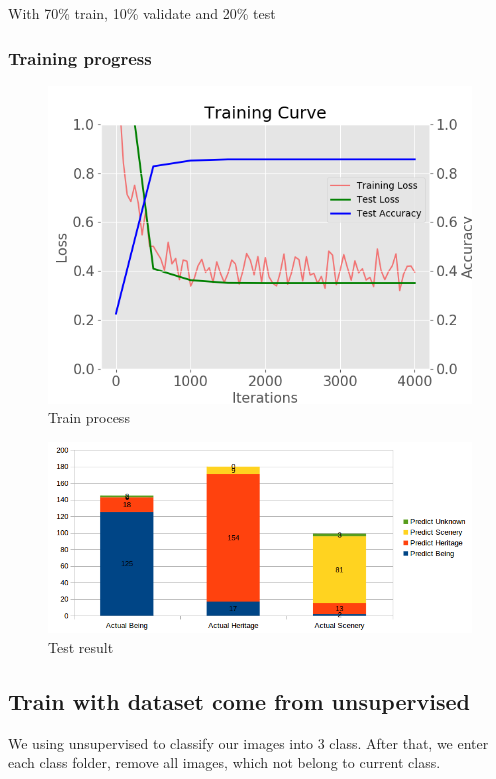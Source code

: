 \documentclass[11pt]{article}
\begin{document}
With 70\% train, 10\% validate and 20\% test

\subsubsection{Training progress}

\begin{figure}[H]
\centering
\includegraphics[width=1\textwidth]{images/train_large_dataset}
\caption{Train process}
\end{figure}

\begin{figure}[H]
\centering
\includegraphics[width=1\textwidth]{images/result_large_dataset}
\caption{Test result}
\end{figure}

\subsection{Train with dataset come from unsupervised}
We using unsupervised to classify our images into 3 class. After that, we enter each class folder, remove all images, which not belong to current class. 
\end{document}
